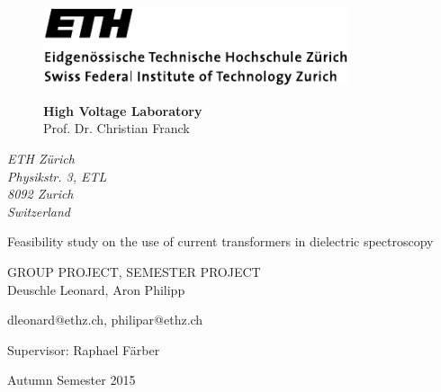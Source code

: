 


\pagestyle{empty}

\begin{figure}
    \begin{minipage}[b]{0.5\linewidth}
        \includegraphics[width=0.8\textwidth]{figures/ethlogo}
    \end{minipage}
    \hfill
    \begin{minipage}[b]{0.45\linewidth}
        \flushright
        \textbf{High Voltage Laboratory}\\
        \vspace{3mm}
        Prof. Dr. Christian Franck
    \end{minipage}
\end{figure}


\begin{flushright}
    \textit{ETH Z\"urich\\
    Physikstr. 3, ETL\\
    8092 Zurich\\
    Switzerland}
\end{flushright}

\phantom{u}
\vspace{1.5cm}
\Huge{\sc Feasibility study on the use of current transformers in dielectric spectroscopy}
\vspace{1.5cm}

\Large
GROUP PROJECT, SEMESTER PROJECT\\

\vspace*{5cm} \large
Deuschle Leonard, Aron Philipp

dleonard@ethz.ch, philipar@ethz.ch

\normalsize

\vspace{1.5cm}

Supervisor: Raphael F\"arber

Autumn Semester 2015